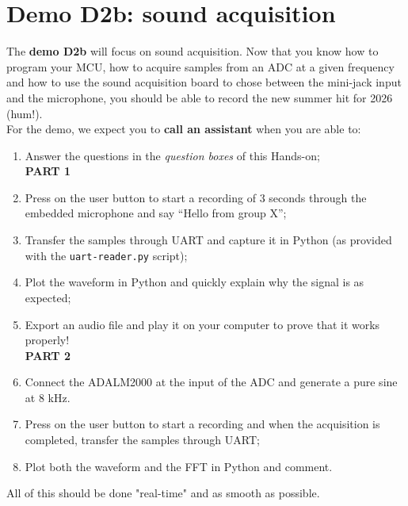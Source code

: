 \clearpage
\section{Demo D2b: sound acquisition}

The \textbf{demo D2b} will focus on sound acquisition. Now that you know how to program your MCU, how to acquire samples from an ADC at a given frequency and how to use the sound acquisition board to chose between the mini-jack input and the microphone, you should be able to record the new summer hit for 2026 (hum!). \\

\noindent For the demo, we expect you to \textbf{call an assistant} when you are able to:

\begin{enumerate}
    \item Answer the questions in the \textit{question boxes} \bcquestion of this Hands-on; \\

    \textbf{PART 1}
    \item Press on the user button to start a recording of 3 seconds through the embedded microphone and say “Hello from group X”;
    \item Transfer the samples through UART and capture it in Python (as provided with the \texttt{uart-reader.py} script);
    \item Plot the waveform in Python and quickly explain why the signal is as expected;
    \item Export an audio file and play it on your computer to prove that it works properly! \\

    \textbf{PART 2}
    \item Connect the ADALM2000 at the input of the ADC and generate a pure sine at 8 kHz.
    \item Press on the user button to start a recording and when the acquisition is completed, transfer the samples through UART;
    \item Plot both the waveform and the FFT in Python and comment.
\end{enumerate}

\vspace{0.3cm}
\noindent All of this should be done "real-time" and as smooth as possible.

